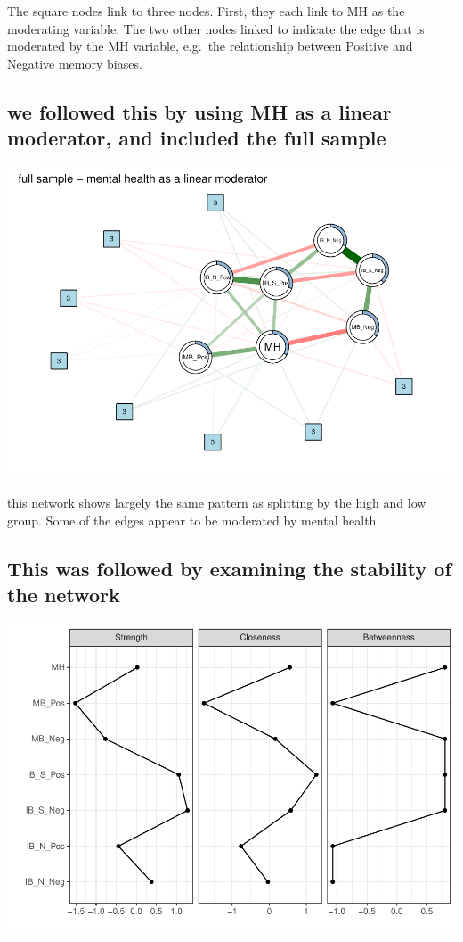 \documentclass[man,floatsintext]{apa6}
\begin{document}
The square nodes link to three nodes. First, they each link to MH as the moderating variable. The two other nodes linked to indicate the edge that is moderated by the MH variable, e.g.~the relationship between Positive and Negative memory biases.

\hypertarget{we-followed-this-by-using-mh-as-a-linear-moderator-and-included-the-full-sample}{%
\subsection{we followed this by using MH as a linear moderator, and included the full sample}\label{we-followed-this-by-using-mh-as-a-linear-moderator-and-included-the-full-sample}}

\includegraphics{script_files/figure-latex/unnamed-chunk-5-1.pdf}

this network shows largely the same pattern as splitting by the high and low group. Some of the edges appear to be moderated by mental health.

\hypertarget{this-was-followed-by-examining-the-stability-of-the-network}{%
\subsection{This was followed by examining the stability of the network}\label{this-was-followed-by-examining-the-stability-of-the-network}}

\includegraphics{script_files/figure-latex/centralityplot-1.pdf}
\end{document}
